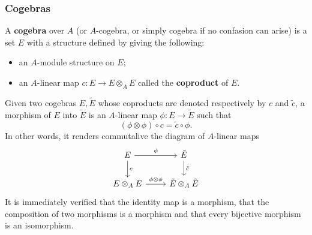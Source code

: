 \subsubsection{Cogebras}
A \textbf{cogebra} over $A$ (or $A$-cogebra, or simply cogebra if no confasion can arise) is a set $E$ with a structure defined by giving the following:
\begin{itemize}
\item an $A$-module structure on $E$;
\item an $A$-linear map $c:E\to E\otimes_AE$ called the \textbf{coproduct} of $E$.
\end{itemize}
Given two cogebras $E,\tilde{E}$ whose coproducts are denoted respectively by $c$ and $\tilde{c}$, a morphism of $E$ into $\tilde{E}$ is an $A$-linear map $\phi:E\to\tilde{E}$ such that
\[(\phi\otimes\phi)\circ c=\tilde{c}\circ\phi.\]
In other words, it renders commutalive the diagram of $A$-linear maps
\[\begin{tikzcd}
E\ar[d,"c"]\ar[r,"\phi"]&\tilde{E}\ar[d,"\tilde{c}"]\\
E\otimes_AE\ar[r,"\phi\otimes\phi"]&\tilde{E}\otimes_A\tilde{E}
\end{tikzcd}\]
It is immediately verified that the identity map is a morphism, that the composition of two morphisms is a morphism and that every bijective morphism is an isomorphism.
